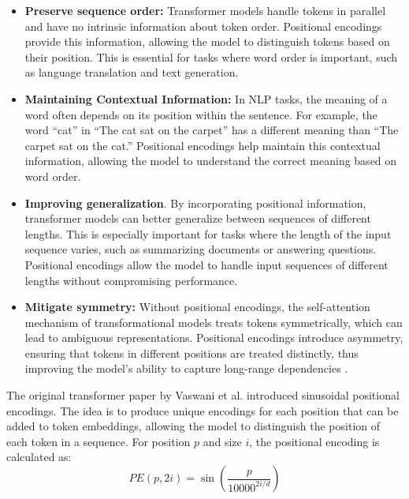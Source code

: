 \begin{itemize}
    \item \textbf{Preserve sequence order:} Transformer models handle tokens in parallel and have no intrinsic information about token order. Positional encodings provide this information, allowing the model to distinguish tokens based on their position. This is essential for tasks where word order is important, such as language translation and text generation.
    
    \item \textbf{Maintaining Contextual Information:} In NLP tasks, the meaning of a word often depends on its position within the sentence. For example, the word “cat” in “The cat sat on the carpet” has a different meaning than “The carpet sat on the cat.” Positional encodings help maintain this contextual information, allowing the model to understand the correct meaning based on word order.
    
    \item \textbf{Improving generalization}. By incorporating positional information, transformer models can better generalize between sequences of different lengths. This is especially important for tasks where the length of the input sequence varies, such as summarizing documents or answering questions. Positional encodings allow the model to handle input sequences of different lengths without compromising performance.
    
    \item \textbf{Mitigate symmetry:} Without positional encodings, the self-attention mechanism of transformational models treats tokens symmetrically, which can lead to ambiguous representations. Positional encodings introduce asymmetry, ensuring that tokens in different positions are treated distinctly, thus improving the model's ability to capture long-range dependencies \cite{geeksforgeeks2024-pe}.
\end{itemize}

The original transformer paper by Vaswani et al. \cite{vaswani2017attention} introduced sinusoidal positional encodings. The idea is to produce unique encodings for each position that can be added to token embeddings, allowing the model to distinguish the position of each token in a sequence. For position \( p \) and size \( i \), the positional encoding is calculated as:
\begin{equation}
    PE(p, 2i) = \sin\left(\frac{p}{10000^{2i/d}}\right)
\end{equation}

